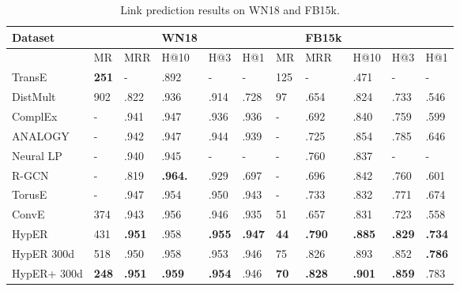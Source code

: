 \begin{table}[H]
\caption{Link prediction results on WN18 and FB15k.}
\centering
\begin{tabular}{lllllllllll}
  \textbf{Dataset} & & &  \textbf{WN18} & & & & \textbf{FB15k} \\
  \hline 
                    	& MR    		& MRR    		& H@10		& H@3    		& H@1    		& MR    		& MRR    		& H@10     	& H@3     		& H@1 \\
  \hline
  TransE       	& \textbf{251}   	& -           		& .892       	& -            		& -           		& 125    		& -          		& .471         	& -            		& - \\
  DistMult      	& 902  		& .822      		& .936      		& .914       	& .728     		& 97      		& .654     		& .824        	& .733       	& .546 \\
  ComplEx    	& -       		& .941      		& .947     		& .936       	& .936     		& -        		& .692      		& .840       	& .759       	& .599 \\
  ANALOGY  	& -      		& .942       	& .947      		& .944       	& .939    		& -         		& .725     		& .854         	& .785       	& .646 \\
  Neural LP   	& -       		& .940      		& .945      		& -             	& -          		& -        		& .760      		& .837         	& -             	& - \\
  R-GCN       	& -       		& .819      		& \textbf{.964.} 	& .929       	& .697     		& -        		& .696      		& .842         	& .760       	& .601 \\
  TorusE        	& -       		& .947      		& .954      		& .950       	& .943     		& -        		& .733      		& .832        	& .771       	& .674 \\
  ConvE        	& 374   		& .943     		& .956      		& .946       	& .935     		& 51      		& .657      		& .831        	& .723       	& .558 \\
  HypER       	& 431   		& \textbf{.951}   & .958      		& \textbf{.955}  	& \textbf{.947}  	& \textbf{44}     	& \textbf{.790}  	& \textbf{.885}  	& \textbf{.829}  	& \textbf{.734} \\
  \hline
  HypER 300d 	& 518 		& .950    		& .958      		& .953        	& .946     		& 75      		& .826      		& .893       	& .852        	& \textbf{.786} \\
  HypER+ 300d	& \textbf{248} 	& \textbf{.951}  	& \textbf{.959}  	& \textbf{.954}  	& .946     		& \textbf{70}     	& \textbf{.828}  	& \textbf{.901}  	& \textbf{.859}   & .783

\end{tabular}
\end{table}

